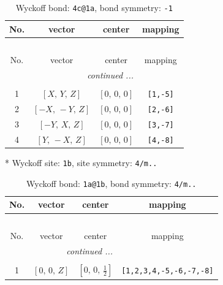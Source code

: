 \documentclass[fleqn,8pt]{jsarticle}
\begin{document}
\renewcommand{\arraystretch}{1.2}
\begin{longtable}{cccc}
\caption{Wyckoff bond: {\tt 4c@1a}, bond symmetry: {\tt -1}}
 \\
 \hline \hline
No. & vector & center & mapping \\ \hline \endfirsthead

\multicolumn{3}{l}{\tablename\ \thetable{}} \\
 \hline \hline
No. & vector & center & mapping \\ \hline \endhead

 \hline \hline
\multicolumn{3}{r}{\footnotesize\it continued ...} \\ \endfoot

 \hline \hline
\multicolumn{3}{r}{} \\ \endlastfoot

1 & $\left[ X,\, Y,\, Z \right]$ & $\left[ 0,\, 0,\, 0 \right]$ & {\tt [1,-5]} \\ \hline
2 & $\left[ - X,\, - Y,\, Z \right]$ & $\left[ 0,\, 0,\, 0 \right]$ & {\tt [2,-6]} \\ \hline
3 & $\left[ - Y,\, X,\, Z \right]$ & $\left[ 0,\, 0,\, 0 \right]$ & {\tt [3,-7]} \\ \hline
4 & $\left[ Y,\, - X,\, Z \right]$ & $\left[ 0,\, 0,\, 0 \right]$ & {\tt [4,-8]} \\
\end{longtable}
* Wyckoff site: {\tt 1b}, site symmetry: {\tt 4/m..}
\renewcommand{\arraystretch}{1.2}
\begin{longtable}{cccc}
\caption{Wyckoff bond: {\tt 1a@1b}, bond symmetry: {\tt 4/m..}}
 \\
 \hline \hline
No. & vector & center & mapping \\ \hline \endfirsthead

\multicolumn{3}{l}{\tablename\ \thetable{}} \\
 \hline \hline
No. & vector & center & mapping \\ \hline \endhead

 \hline \hline
\multicolumn{3}{r}{\footnotesize\it continued ...} \\ \endfoot

 \hline \hline
\multicolumn{3}{r}{} \\ \endlastfoot

1 & $\left[ 0,\, 0,\, Z \right]$ & $\left[ 0,\, 0,\, \frac{1}{2} \right]$ & {\tt [1,2,3,4,-5,-6,-7,-8]} \\
\end{longtable}
\renewcommand{\arraystretch}{1.2}
\end{document}
